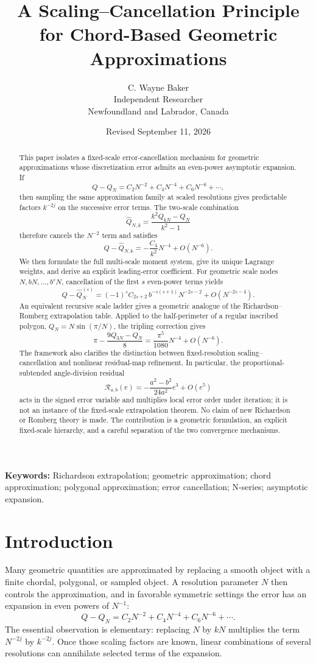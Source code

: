 \documentclass[11pt]{article}
\title{A Scaling--Cancellation Principle for Chord-Based Geometric Approximations}
\author{C. Wayne Baker\\Independent Researcher\\Newfoundland and Labrador, Canada}
\date{Revised September 11, 2026}
\theoremstyle{remark}
\newcommand{\wideQ}{\widehat{Q}}
\begin{document}
\maketitle

\begin{abstract}
This paper isolates a fixed-scale error-cancellation mechanism for geometric
approximations whose discretization error admits an even-power asymptotic
expansion.  If
\[
Q-Q_N
=
C_2N^{-2}+C_4N^{-4}+C_6N^{-6}+\cdots,
\]
then sampling the same approximation family at scaled resolutions gives
predictable factors $k^{-2j}$ on the successive error terms.  The two-scale
combination
\[
\wideQ_{N,k}
=
\frac{k^2Q_{kN}-Q_N}{k^2-1}
\]
therefore cancels the $N^{-2}$ term and satisfies
\[
Q-\wideQ_{N,k}
=
-\frac{C_4}{k^2}N^{-4}+O(N^{-6}).
\]
We then formulate the full multi-scale moment system, give its unique
Lagrange weights, and derive an explicit leading-error coefficient.  For
geometric scale nodes $N,bN,\ldots,b^sN$, cancellation of the first $s$
even-power terms yields
\[
Q-\wideQ_N^{(s)}
=
(-1)^s C_{2s+2}\,b^{-s(s+1)}N^{-2s-2}
+O(N^{-2s-4}).
\]
An equivalent recursive scale ladder gives a geometric analogue of the
Richardson--Romberg extrapolation table.  Applied to the half-perimeter of a
regular inscribed polygon,
$Q_N=N\sin(\pi/N)$, the tripling correction gives
\[
\pi-\frac{9Q_{3N}-Q_N}{8}
=
\frac{\pi^5}{1080}N^{-4}+O(N^{-6}).
\]
The framework also clarifies the distinction between fixed-resolution
scaling--cancellation and nonlinear residual-map refinement.  In particular,
the proportional-subtended angle-division residual
\[
\mathscr{R}_{a,b}(e)
=
-\frac{a^2-b^2}{24a^2}e^3+O(e^5)
\]
acts in the signed error variable and multiplies local error order under
iteration; it is not an instance of the fixed-scale extrapolation theorem.
No claim of new Richardson or Romberg theory is made.  The contribution is a
geometric formulation, an explicit fixed-scale hierarchy, and a careful
separation of the two convergence mechanisms.
\end{abstract}

\noindent\textbf{Keywords:}
Richardson extrapolation; geometric approximation; chord approximation;
polygonal approximation; error cancellation; N-series; asymptotic expansion.

\section{Introduction}

Many geometric quantities are approximated by replacing a smooth object with
a finite chordal, polygonal, or sampled object.  A resolution parameter $N$
then controls the approximation, and in favorable symmetric settings the
error has an expansion in even powers of $N^{-1}$:
\begin{equation}
\label{eq:even-expansion-intro}
Q-Q_N
=
C_2N^{-2}+C_4N^{-4}+C_6N^{-6}+\cdots.
\end{equation}
The essential observation is elementary: replacing $N$ by $kN$ multiplies
the term $N^{-2j}$ by $k^{-2j}$.  Once those scaling factors are known,
linear combinations of several resolutions can annihilate selected terms of
the expansion.
\end{document}
